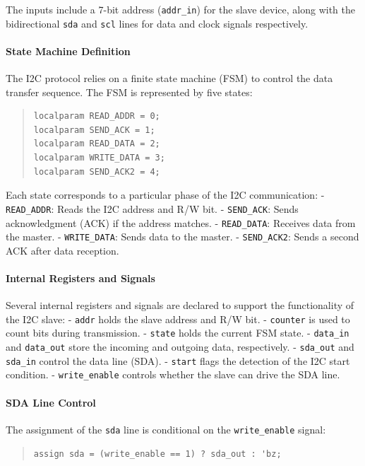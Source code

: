 \documentclass[a4paper,12pt]{report}
\begin{document}
The inputs include a 7-bit address (\texttt{addr\_in}) for the slave device, along with the bidirectional \texttt{sda} and \texttt{scl} lines for data and clock signals respectively.

\paragraph{State Machine Definition}
The I2C protocol relies on a finite state machine (FSM) to control the data transfer sequence. The FSM is represented by five states:

\begin{quote}
\begin{verbatim}
localparam READ_ADDR = 0;
localparam SEND_ACK = 1;
localparam READ_DATA = 2;
localparam WRITE_DATA = 3;
localparam SEND_ACK2 = 4;
\end{verbatim}
\end{quote}

Each state corresponds to a particular phase of the I2C communication:
- \texttt{READ\_ADDR}: Reads the I2C address and R/W bit.
- \texttt{SEND\_ACK}: Sends acknowledgment (ACK) if the address matches.
- \texttt{READ\_DATA}: Receives data from the master.
- \texttt{WRITE\_DATA}: Sends data to the master.
- \texttt{SEND\_ACK2}: Sends a second ACK after data reception.

\paragraph{Internal Registers and Signals}
Several internal registers and signals are declared to support the functionality of the I2C slave:
- \texttt{addr} holds the slave address and R/W bit.
- \texttt{counter} is used to count bits during transmission.
- \texttt{state} holds the current FSM state.
- \texttt{data\_in} and \texttt{data\_out} store the incoming and outgoing data, respectively.
- \texttt{sda\_out} and \texttt{sda\_in} control the data line (SDA).
- \texttt{start} flags the detection of the I2C start condition.
- \texttt{write\_enable} controls whether the slave can drive the SDA line.

\paragraph{SDA Line Control}
The assignment of the \texttt{sda} line is conditional on the \texttt{write\_enable} signal:

\begin{quote}
\begin{verbatim}
assign sda = (write_enable == 1) ? sda_out : 'bz;
\end{verbatim}
\end{quote}
\end{document}
